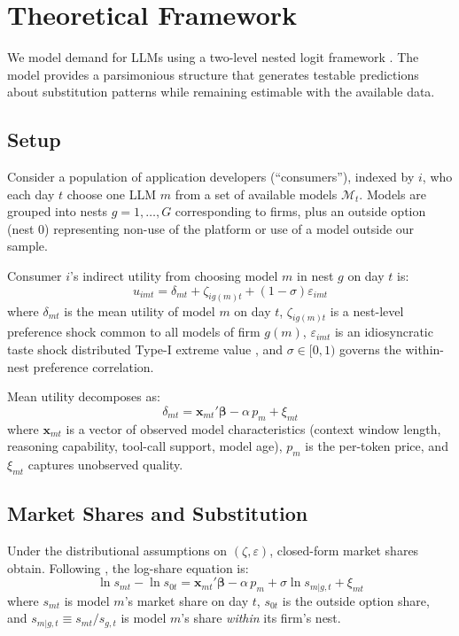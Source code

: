 \documentclass[11pt, a4paper]{article}
\begin{document}
\section{Theoretical Framework}
\label{sec:theory}

We model demand for LLMs using a two-level nested logit framework \citep{berry1994estimating, mcfadden1978modelling}. The model provides a parsimonious structure that generates testable predictions about substitution patterns while remaining estimable with the available data.

\subsection{Setup}

Consider a population of application developers (``consumers''), indexed by $i$, who each day $t$ choose one LLM $m$ from a set of available models $\mathcal{M}_t$. Models are grouped into nests $g = 1, \ldots, G$ corresponding to firms, plus an outside option (nest 0) representing non-use of the platform or use of a model outside our sample.

Consumer $i$'s indirect utility from choosing model $m$ in nest $g$ on day $t$ is:
\begin{equation}
u_{imt} = \delta_{mt} + \zeta_{ig(m)t} + (1 - \sigma)\varepsilon_{imt}
\label{eq:utility}
\end{equation}
where $\delta_{mt}$ is the mean utility of model $m$ on day $t$, $\zeta_{ig(m)t}$ is a nest-level preference shock common to all models of firm $g(m)$, $\varepsilon_{imt}$ is an idiosyncratic taste shock distributed Type-I extreme value \citep{cardell1997variance}, and $\sigma \in [0, 1)$ governs the within-nest preference correlation.

Mean utility decomposes as:
\begin{equation}
\delta_{mt} = \mathbf{x}_{mt}'\boldsymbol{\beta} - \alpha \, p_m + \xi_{mt}
\label{eq:meanutil}
\end{equation}
where $\mathbf{x}_{mt}$ is a vector of observed model characteristics (context window length, reasoning capability, tool-call support, model age), $p_m$ is the per-token price, and $\xi_{mt}$ captures unobserved quality.

\subsection{Market Shares and Substitution}

Under the distributional assumptions on $(\zeta, \varepsilon)$, closed-form market shares obtain. Following \citet{berry1994estimating}, the log-share equation is:
\begin{equation}
\ln s_{mt} - \ln s_{0t} = \mathbf{x}_{mt}'\boldsymbol{\beta} - \alpha \, p_m + \sigma \ln s_{m|g,t} + \xi_{mt}
\label{eq:berry}
\end{equation}
where $s_{mt}$ is model $m$'s market share on day $t$, $s_{0t}$ is the outside option share, and $s_{m|g,t} \equiv s_{mt} / s_{g,t}$ is model $m$'s share \emph{within} its firm's nest.
\end{document}
